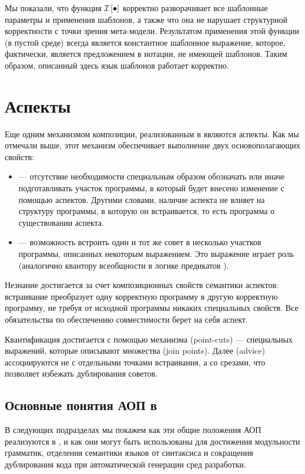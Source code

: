 Мы показали, что функция $\mathcal{I}_{} \left[ \bullet \right]$ корректно разворачивает все шаблонные параметры и применения шаблонов, а также что она не нарушает структурной корректности с точки зрения мета-модели. Результатом применения этой функции (в пустой среде) всегда является константное шаблонное выражение, которое, фактически, является предложением в нотации, не имеющей шаблонов. Таким образом, описанный здесь язык шаблонов работает корректно.

\chapter{Аспекты}%
%
Еще одним механизмом композиции, реализованным в  являются аспекты. Как мы отмечали выше, этот механизм обеспечивает выполнение двух основополагающих свойств:
\begin{itemize}
\item {} --- отсутствие необходимости специальным образом обозначать или иначе подготавливать участок программы, в который будет внесено изменение с помощью аспектов. Другими словами, наличие аспекта не влияет на структуру программы, в которую он встраивается, то есть программа  о существовании аспекта.
\item {} --- возможность встроить один и тот же совет в несколько участков программы, описанных некоторым выражением. Это выражение играет роль  (аналогично квантору всеобщности в логике предикатов \cite{???}).
\end{itemize}

Незнание достигается за счет композиционных свойств семантики аспектов: встраивание преобразует одну корректную программу в другую корректную программу, не требуя от исходной программы никаких специальных свойств. Все обязательства по обеспечению совместимости берет на себя аспект.

Квантификация достигается с помощью механизма  (point-cuts) --- специальных выражений, которые описывают множества  (join points). Далее  (advice) ассоциируются не с отдельными точками встраивания, а со срезами, что позволяет избежать дублирования советов.

\section{Основные понятия АОП в }

В следующих подразделах мы покажем как эти общие положения АОП реализуются в , и как они могут быть использованы для достижения модульности грамматик, отделения семантики языков от синтаксиса и сокращения дублирования кода при автоматической генерации сред разработки.

